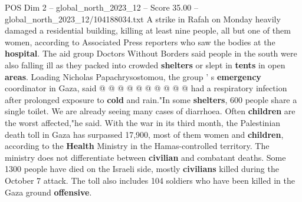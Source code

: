 \begin{textsample}{POS Dim 2 – global\_north\_2023\_12 – Score 35.00 – global\_north\_2023\_12/104188034.txt}
A strike in Rafah on Monday heavily damaged a residential building, killing at least nine people, all but one of them women, according to Associated Press reporters who saw the bodies at the \textbf{hospital}.
The aid group Doctors Without Borders said people in the south were also falling ill as they packed into crowded \textbf{shelters} or slept in \textbf{tents} in open \textbf{areas}.
Loading Nicholas Papachrysostomou, the group ' s \textbf{emergency} coordinator in Gaza, said @ @ @ @ @ @ @ @ @ @ had a respiratory infection after prolonged exposure to \textbf{cold} and rain."In some \textbf{shelters}, 600 people share a single toilet.
We are already seeing many cases of diarrhoea.
Often \textbf{children} are the worst affected,"he said.
With the war in its third month, the Palestinian death toll in Gaza has surpassed 17,900, most of them women and \textbf{children}, according to the \textbf{Health} Ministry in the Hamas-controlled territory.
The ministry does not differentiate between \textbf{civilian} and combatant deaths.
Some 1300 people have died on the Israeli side, mostly \textbf{civilians} killed during the October 7 attack.
The toll also includes 104 soldiers who have been killed in the Gaza ground \textbf{offensive}.

\end{textsample}
